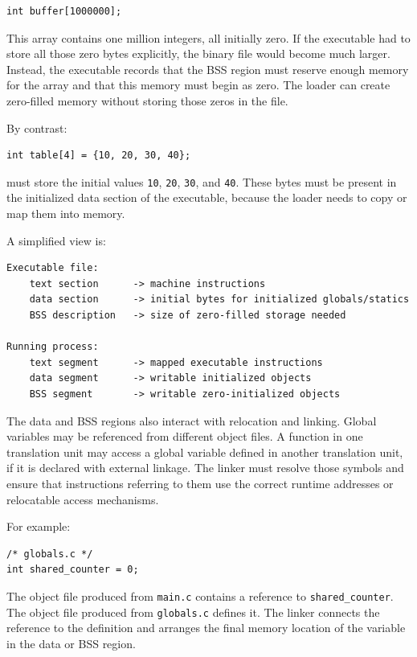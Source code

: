 \begin{verbatim}
int buffer[1000000];
\end{verbatim}

This array contains one million integers, all initially zero. If the executable had to store all those zero bytes explicitly, the binary file would become much larger. Instead, the executable records that the BSS region must reserve enough memory for the array and that this memory must begin as zero. The loader can create zero-filled memory without storing those zeros in the file.

By contrast:

\begin{verbatim}
int table[4] = {10, 20, 30, 40};
\end{verbatim}

must store the initial values \texttt{10}, \texttt{20}, \texttt{30}, and \texttt{40}. These bytes must be present in the initialized data section of the executable, because the loader needs to copy or map them into memory.

A simplified view is:

\begin{verbatim}
Executable file:
    text section      -> machine instructions
    data section      -> initial bytes for initialized globals/statics
    BSS description   -> size of zero-filled storage needed

Running process:
    text segment      -> mapped executable instructions
    data segment      -> writable initialized objects
    BSS segment       -> writable zero-initialized objects
\end{verbatim}

The data and BSS regions also interact with relocation and linking. Global variables may be referenced from different object files. A function in one translation unit may access a global variable defined in another translation unit, if it is declared with external linkage. The linker must resolve those symbols and ensure that instructions referring to them use the correct runtime addresses or relocatable access mechanisms.

For example:

\begin{verbatim}
/* globals.c */
int shared_counter = 0;
\end{verbatim}

The object file produced from \texttt{main.c} contains a reference to \texttt{shared\_counter}. The object file produced from \texttt{globals.c} defines it. The linker connects the reference to the definition and arranges the final memory location of the variable in the data or BSS region.

